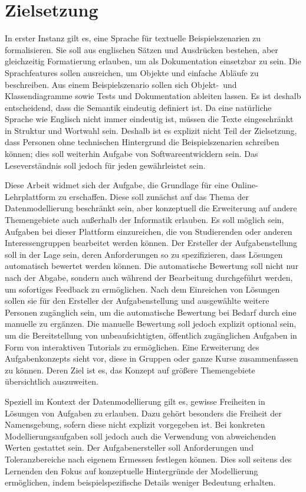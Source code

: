 \chapter{Zielsetzung}\label{ch:goals}

In erster Instanz gilt es, eine Sprache für textuelle Beispielszenarien zu formalisieren.
Sie soll aus englischen Sätzen und Ausdrücken bestehen, aber gleichzeitig Formatierung erlauben, um als Dokumentation einsetzbar zu sein.
Die Sprachfeatures sollen ausreichen, um Objekte und einfache Abläufe zu beschreiben.
Aus einem Beispielszenario sollen sich Objekt-\ und Klassendiagramme sowie Tests und Dokumentation ableiten lassen.
Es ist deshalb entscheidend, dass die Semantik eindeutig definiert ist.
Da eine natürliche Sprache wie Englisch nicht immer eindeutig ist, müssen die Texte eingeschränkt in Struktur und Wortwahl sein.
Deshalb ist es explizit nicht Teil der Zielsetzung, dass Personen ohne technischen Hintergrund die Beispielszenarien schreiben können;
dies soll weiterhin Aufgabe von Softwareentwicklern sein.
Das Leseverständnis soll jedoch für jeden gewährleistet sein.

Diese Arbeit widmet sich der Aufgabe, die Grundlage für eine Online-Lehrplattform zu erschaffen.
Diese soll zunächst auf das Thema der Datenmodellierung beschränkt sein, aber konzeptuell die Erweiterung auf andere Themengebiete auch außerhalb der Informatik erlauben.
Es soll möglich sein, Aufgaben bei dieser Plattform einzureichen, die von Studierenden oder anderen Interessengruppen bearbeitet werden können.
Der Ersteller der Aufgabenstellung soll in der Lage sein, deren Anforderungen so zu spezifizieren, dass Lösungen automatisch bewertet werden können.
Die automatische Bewertung soll nicht nur nach der Abgabe, sondern auch während der Bearbeitung durchgeführt werden, um sofortiges Feedback zu ermöglichen.
Nach dem Einreichen von Lösungen sollen sie für den Ersteller der Aufgabenstellung und ausgewählte weitere Personen zugänglich sein, um die automatische Bewertung bei Bedarf durch eine manuelle zu ergänzen.
Die manuelle Bewertung soll jedoch explizit optional sein, um die Bereitstellung von unbeaufsichtigten, öffentlich zugänglichen Aufgaben in Form von interaktiven Tutorials zu ermöglichen.
Eine Erweiterung des Aufgabenkonzepts sieht vor, diese in Gruppen oder ganze Kurse zusammenfassen zu können.
Deren Ziel ist es, das Konzept auf größere Themengebiete übersichtlich auszuweiten.

Speziell im Kontext der Datenmodellierung gilt es, gewisse Freiheiten in Lösungen von Aufgaben zu erlauben.
Dazu gehört besonders die Freiheit der Namensgebung, sofern diese nicht explizit vorgegeben ist.
Bei konkreten Modellierungsaufgaben soll jedoch auch die Verwendung von abweichenden Werten gestattet sein.
Der Aufgabenersteller soll Anforderungen und Toleranzbereiche nach eigenem Ermessen festlegen können.
Dies soll seitens des Lernenden den Fokus auf konzeptuelle Hintergründe der Modellierung ermöglichen, indem beispielspezifische Details weniger Bedeutung erhalten.
